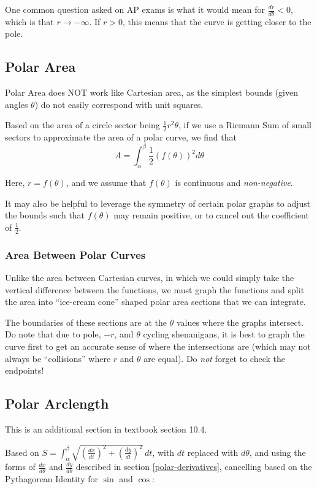 \documentclass{article}
\begin{document}
One common question asked on AP exams is what it would mean for $\frac{dr}{d\theta} < 0$, which is that $r \to -\infty$. If $r > 0$, this means that the curve is getting closer to the pole.

\subsection{Polar Area}
Polar Area does NOT work like Cartesian area, as the simplest bounds (given angles $\theta$) do not easily correspond with unit squares.

Based on the area of a circle sector being $\frac{1}{2}r^2\theta$, if we use a Riemann Sum of small sectors to approximate the area of a polar curve, we find that
$$A = \int_{\alpha}^{\beta} \frac{1}{2} \left(f(\theta)\right)^2 d\theta$$

Here,  $r = f(\theta)$, and we assume that $f(\theta)$ is continuous and \emph{non-negative}.

It may also be helpful to leverage the symmetry of certain polar graphs to adjust the bounds such that $f(\theta)$ may remain positive, or to cancel out the coefficient of $\frac{1}{2}$.

\subsubsection{Area Between Polar Curves}
Unlike the area between Cartesian curves, in which we could simply take the vertical difference between the functions, we must graph the functions and split the area into ``ice-cream cone'' shaped polar area sections that we can integrate.

The boundaries of these sections are at the $\theta$ values where the graphs intersect. Do note that due to pole, $-r$, and $\theta$ cycling shenanigans, it is best to graph the curve first to get an accurate sense of where the intersections are (which may not always be ``collisions'' where $r$ and $\theta$ are equal). Do \emph{not} forget to check the endpoints!

\subsection{Polar Arclength}
This is an additional section in textbook section 10.4.

\vspace{.15in}
Based on $S = \int_{\alpha}^{\beta} \sqrt{\left(\frac{dx}{dt}\right)^2 + \left(\frac{dy}{dt}\right)^2} \,dt$, with $dt$ replaced with $d\theta$, and using the forms of $\frac{dx}{d\theta}$ and $\frac{dy}{d\theta}$ described in section \ref{polar-derivatives}, cancelling based on the Pythagorean Identity for $\sin$ and $\cos$:
\end{document}

